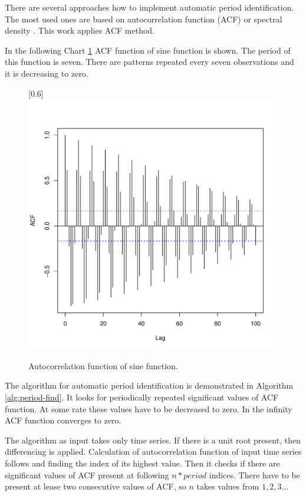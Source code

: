     There are several approaches how to implement automatic period identification. The most used ones are based on
    autocorrelation function (ACF) or spectral density \cite{period-hydman}. This work applies ACF method.

    In the following Chart \ref{img:period-acf} ACF function of sine function is shown. The period of this
    function is seven. There are patterns repeated every seven observations and it is decreasing to zero.

    \begin{figure}[H]
        \begin{center}
            \scalebox{0.73}[0.6]{\includegraphics{img/acf-sine.pdf}}
            \caption{Autocorrelation function of sine function.}
            \label{img:period-acf}
        \end{center}
    \end{figure}

    The algorithm for automatic period identification is demonstrated in Algorithm \ref{alg:period-find}.
    It looks for periodically repeated significant values of ACF function. At some rate these values have to
    be decreased to zero. In the infinity ACF function converges to zero.

    The algorithm as input takes only time series. If there is a unit root present, then differencing is applied.
    Calculation of autocorrelation function of input time series follows and finding the index of its highest
    value. Then it checks if there are significant values of ACF present at following $n*period$ indices.
    There have to be present at lease two consecutive values of ACF, so $n$ takes values from $1,2,3\dots$

